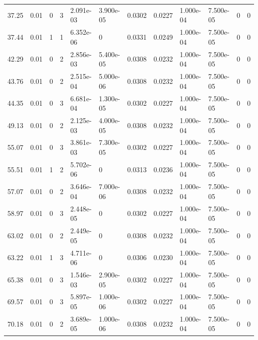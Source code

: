 \documentclass[preview]{standalone}
\begin{document}
{{\begin{tabular}{L{1.2cm}C{1.2cm} C{0.3cm}C{0.5cm} C{1.4cm}C{1.4cm} C{1.4cm}C{1.4cm} C{1.6cm}C{1.6cm} C{1.6cm}C{1.6cm}}
  37.25  &  0.01  & 0     &  3 &  2.091e-03  & 3.900e-05  &  0.0302&   0.0227& 1.000e-04 & 7.500e-05   &  0 & 0  \\ 
  37.44  &  0.01  & 1     &  1 &  6.352e-06  & 0  &  0.0331&   0.0249& 1.000e-04 & 7.500e-05   &  0 & 0  \\ 
  42.29  &  0.01  & 0     &  2 &  2.856e-03  & 5.400e-05  &  0.0308&   0.0232& 1.000e-04 & 7.500e-05   &  0 & 0  \\ 
  43.76  &  0.01  & 0     &  2 &  2.515e-04  & 5.000e-06  &  0.0308&   0.0232& 1.000e-04 & 7.500e-05   &  0 & 0  \\ 
  44.35  &  0.01  & 0     &  3 &  6.681e-04  & 1.300e-05  &  0.0302&   0.0227& 1.000e-04 & 7.500e-05   &  0 & 0  \\ 
  49.13  &  0.01  & 0     &  2 &  2.125e-03  & 4.000e-05  &  0.0308&   0.0232& 1.000e-04 & 7.500e-05   &  0 & 0  \\ 
  55.07  &  0.01  & 0     &  3 &  3.861e-03  & 7.300e-05  &  0.0302&   0.0227& 1.000e-04 & 7.500e-05   &  0 & 0  \\ 
  55.51  &  0.01  & 1     &  2 &  5.702e-06  & 0  &  0.0313&   0.0236& 1.000e-04 & 7.500e-05   &  0 & 0  \\ 
  57.07  &  0.01  & 0     &  2 &  3.646e-04  & 7.000e-06  &  0.0308&   0.0232& 1.000e-04 & 7.500e-05   &  0 & 0  \\ 
  58.97  &  0.01  & 0     &  3 &  2.448e-05  & 0  &  0.0302&   0.0227& 1.000e-04 & 7.500e-05   &  0 & 0  \\ 
  63.02  &  0.01  & 0     &  2 &  2.449e-05  & 0  &  0.0308&   0.0232& 1.000e-04 & 7.500e-05   &  0 & 0  \\ 
  63.22  &  0.01  & 1     &  3 &  4.711e-06  & 0  &  0.0306&   0.0230& 1.000e-04 & 7.500e-05   &  0 & 0  \\ 
  65.38  &  0.01  & 0     &  3 &  1.546e-03  & 2.900e-05  &  0.0302&   0.0227& 1.000e-04 & 7.500e-05   &  0 & 0  \\ 
  69.57  &  0.01  & 0     &  3 &  5.897e-05  & 1.000e-06  &  0.0302&   0.0227& 1.000e-04 & 7.500e-05   &  0 & 0  \\ 
  70.18  &  0.01  & 0     &  2 &  3.689e-05  & 1.000e-06  &  0.0308&   0.0232& 1.000e-04 & 7.500e-05   &  0 & 0  \\ 
\hline 
\end{tabular} 

}}
\end{document}
